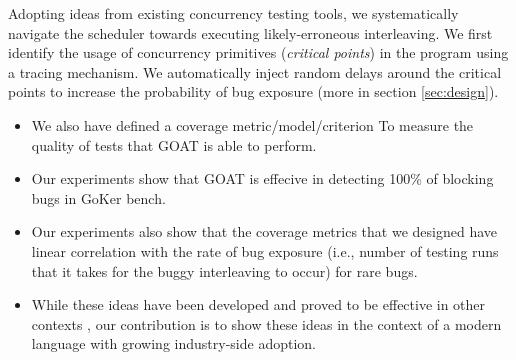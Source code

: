 Adopting ideas from existing concurrency testing tools, we systematically navigate the scheduler towards executing likely-erroneous interleaving.
%
We first identify the usage of concurrency primitives (\textit{critical points}) in the program using a tracing mechanism.
%
We automatically inject random delays around the critical points to increase the probability of bug exposure (more in section \ref{sec:design}).

\begin{itemize}
  \item We also have defined a coverage metric/model/criterion To measure the quality of tests that GOAT is able to perform.
  \item Our experiments show that GOAT is effecive in detecting 100\% of blocking bugs in GoKer bench.
  \item Our experiments also show that the coverage metrics that we designed have linear correlation with the rate of bug exposure (i.e., number of testing runs that it takes for the buggy interleaving to occur) for rare bugs.
  \item While these ideas have been developed and proved to be effective in other contexts \cite{burckhardt-depthBug-asplos10,emmi-delayBounded-popl11,madanlal-preemptionBound-pldi07}, our contribution is to show these ideas in the context of a modern language with growing industry-side adoption.
\end{itemize}
